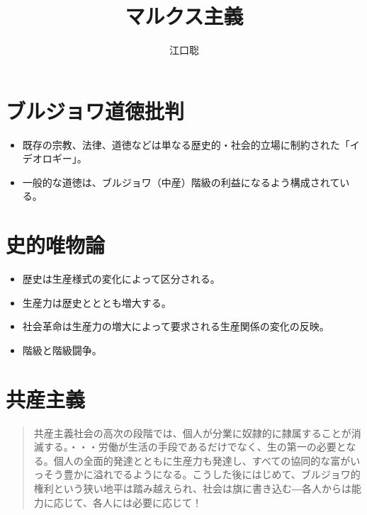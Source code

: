 \documentclass[]{jsarticle}
\author{江口聡}
\title{マルクス主義}
\begin{document}
\maketitle


\section{ブルジョワ道徳批判}

\begin{itemize}
\item 既存の宗教、法律、道徳などは単なる歴史的・社会的立場に制約された「イデオロギー」。
\item 一般的な道徳は、ブルジョワ（中産）階級の利益になるよう構成されている。
\end{itemize}


\section{史的唯物論}

\begin{itemize}
\item 歴史は生産様式の変化によって区分される。
\item 生産力は歴史とととも増大する。
\item 社会革命は生産力の増大によって要求される生産関係の変化の反映。
\item 階級と階級闘争。
\end{itemize}




\section{共産主義}

\begin{quote}
  共産主義社会の高次の段階では、個人が分業に奴隷的に隷属することが消滅する。・・・労働が生活の手段であるだけでなく、生の第一の必要となる。個人の全面的発達とともに生産力も発達し、すべての協同的な富がいっそう豊かに溢れでるようになる。こうした後にはじめて、ブルジョワ的権利という狭い地平は踏み越えられ、社会は旗に書き込む{\――}各人からは能力に応じて、各人には必要に応じて！
\end{quote}
\end{document}
